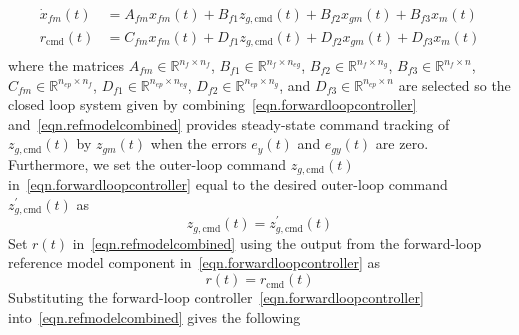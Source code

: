 \begin{equation}
  \label{eqn.forwardloopcontroller}
  \begin{split}
    \dot{x}_{fm}(t) &= A_{fm}x_{fm}(t) + B_{f1}z_{g,\text{cmd}}(t) + B_{f2}x_{gm}(t) + B_{f3}x_{m}(t) \\
    r_{\text{cmd}}(t) &= C_{fm}x_{fm}(t) + D_{f1}z_{g,\text{cmd}}(t) + D_{f2}x_{gm}(t) + D_{f3} x_{m}(t) \\
  \end{split}
\end{equation}
where the matrices $A_{fm}\in\mathbb{R}^{n_{f}\times n_{f}}$, $B_{f1}\in\mathbb{R}^{n_{f}\times n_{eg}}$, $B_{f2}\in\mathbb{R}^{n_{f}\times n_{g}}$, $B_{f3}\in\mathbb{R}^{n_{f}\times n}$, $C_{fm}\in\mathbb{R}^{n_{ep}\times n_{f}}$, $D_{f1}\in\mathbb{R}^{n_{ep}\times n_{eg}}$, $D_{f2}\in\mathbb{R}^{n_{ep}\times n_{g}}$, and $D_{f3}\in\mathbb{R}^{n_{ep}\times n}$ are selected so the closed loop system given by combining\ \eqref{eqn.forwardloopcontroller} and\ \eqref{eqn.refmodelcombined} provides steady-state command tracking of $z_{g,\text{cmd}}(t)$ by $z_{gm}(t)$ when the errors $e_{y}(t)$ and $e_{gy}(t)$ are zero.
Furthermore, we set the outer-loop command $z_{g,\text{cmd}}(t)$ in\ \eqref{eqn.forwardloopcontroller} equal to the desired outer-loop command $z_{g,\text{cmd}}^{\prime}(t)$ as
\begin{equation}
  \label{eqn.zgcmdzgcmdprime}
  z_{g,\text{cmd}}(t) = z_{g,\text{cmd}}^{\prime}(t)
\end{equation}
Set $r(t)$ in\ \eqref{eqn.refmodelcombined} using the output from the forward-loop reference model component in\ \eqref{eqn.forwardloopcontroller} as
\begin{equation}
  \label{eqn.rrcmd}
  r(t) = r_{\text{cmd}}(t)
\end{equation}
Substituting the forward-loop controller\ \eqref{eqn.forwardloopcontroller} into\ \eqref{eqn.refmodelcombined} gives the following
